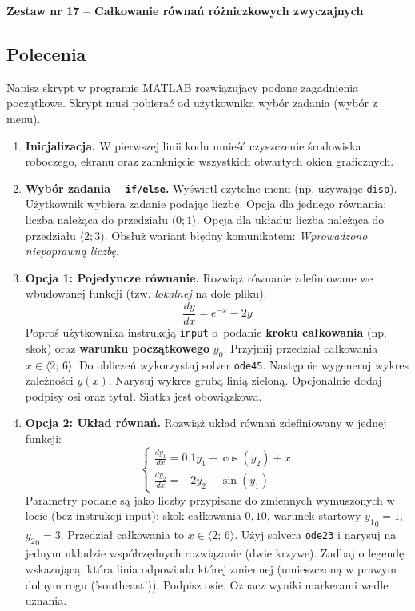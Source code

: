 \documentclass[a4paper,11pt]{article}
\begin{document}
\clearpage
\begin{center}
  {\large\bfseries Zestaw nr 17 \quad -- \quad Całkowanie równań różniczkowych zwyczajnych}
\end{center}
\hrulefill
\vspace{0.4cm}

\subsection*{Polecenia}

Napisz skrypt w programie MATLAB rozwiązujący podane zagadnienia początkowe. Skrypt musi pobierać od użytkownika wybór zadania (wybór z menu).

\begin{enumerate}[leftmargin=*, label=\textbf{\arabic*.}, itemsep=2pt]

  \item \textbf{Inicjalizacja.}
    W pierwszej linii kodu umieść czyszczenie środowiska roboczego, ekranu oraz zamknięcie wszystkich otwartych okien graficznych.

  \item \textbf{Wybór zadania -- \texttt{if/else}.}
    Wyświetl czytelne menu (np. używając \texttt{disp}). Użytkownik wybiera zadanie podając liczbę. Opcja dla jednego równania: liczba należąca do przedziału $(0; 1\rangle$. Opcja dla układu: liczba należąca do przedziału $\langle 2; 3)$. Obsłuż wariant błędny komunikatem: \textit{Wprowadzono niepoprawną liczbę}.

  \item \textbf{Opcja 1: Pojedyncze równanie.}
    Rozwiąż równanie zdefiniowane we wbudowanej funkcji (tzw. \textit{lokalnej} na dole pliku):
    \[ \frac{dy}{dx} = e^{-x} - 2y \]
    Poproś użytkownika instrukcją \texttt{input} o~podanie \textbf{kroku całkowania} (np. skok) oraz \textbf{warunku początkowego} $y_0$. Przyjmij przedział całkowania $x \in \langle 2;\,6 \rangle$.
    Do obliczeń wykorzystaj solver \texttt{ode45}. Następnie wygeneruj wykres zależności $y(x)$. Narysuj wykres grubą linią zieloną. Opcjonalnie dodaj podpisy osi oraz tytuł. Siatka jest obowiązkowa.

  \item \textbf{Opcja 2: Układ równań.}
    Rozwiąż układ równań zdefiniowany w jednej funkcji:\\[-0.5em]
    \[
    \begin{cases}
      \frac{dy_1}{dx} = 0.1y_1 - \cos(y_2) + x \\
      \frac{dy_2}{dx} = -2y_2 + \sin(y_1)
    \end{cases}
    \]
    Parametry podane są jako liczby przypisane do zmiennych wymuszonych w locie (bez instrukcji input): skok całkowania $0{,}10$, warunek startowy $ {y_1}_{0} = 1 $, $ {y_2}_{0} = 3 $. Przedział całkowania to $x \in \langle 2;\,6 \rangle$.
    Użyj solvera \texttt{ode23} i narysuj na jednym układzie współrzędnych rozwiązanie (dwie krzywe). Zadbaj o legendę wskazującą, która linia odpowiada której zmiennej (umieszczoną w prawym dolnym rogu ('southeast')). Podpisz osie. Oznacz wyniki markerami wedle uznania.

\end{enumerate}
\end{document}
